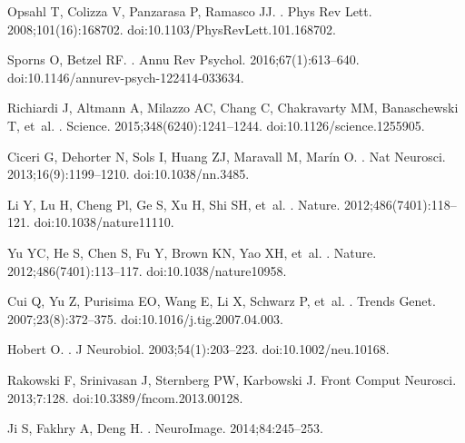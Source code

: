 \documentclass[10pt,letterpaper]{article}
\begin{document}
{\begin{thebibliography}{100}
Opsahl T, Colizza V, Panzarasa P, Ramasco JJ.
.
\newblock Phys Rev Lett. 2008;101(16):168702.
\newblock doi:{10.1103/PhysRevLett.101.168702}.

Sporns O, Betzel RF.
.
\newblock Annu Rev Psychol. 2016;67(1):613--640.
\newblock doi:{10.1146/annurev-psych-122414-033634}.

Richiardi J, Altmann A, Milazzo AC, Chang C, Chakravarty MM, Banaschewski T,
  et~al.
.
\newblock Science. 2015;348(6240):1241--1244.
\newblock doi:{10.1126/science.1255905}.

Ciceri G, Dehorter N, Sols I, Huang ZJ, Maravall M, Mar{\'{i}}n O.
.
\newblock Nat Neurosci. 2013;16(9):1199--1210.
\newblock doi:{10.1038/nn.3485}.

Li Y, Lu H, Cheng Pl, Ge S, Xu H, Shi SH, et~al.
.
\newblock Nature. 2012;486(7401):118--121.
\newblock doi:{10.1038/nature11110}.

Yu YC, He S, Chen S, Fu Y, Brown KN, Yao XH, et~al.
.
\newblock Nature. 2012;486(7401):113--117.
\newblock doi:{10.1038/nature10958}.

Cui Q, Yu Z, Purisima EO, Wang E, Li X, Schwarz P, et~al.
.
\newblock Trends Genet. 2007;23(8):372--375.
\newblock doi:{10.1016/j.tig.2007.04.003}.

Hobert O.
.
\newblock J Neurobiol. 2003;54(1):203--223.
\newblock doi:{10.1002/neu.10168}.

Rakowski F, Srinivasan J, Sternberg PW, Karbowski J.
\newblock Front Comput Neurosci. 2013;7:128.
\newblock doi:{10.3389/fncom.2013.00128}.

Ji S, Fakhry A, Deng H.
.
\newblock NeuroImage. 2014;84:245--253.


\end{thebibliography}}
\end{document}
